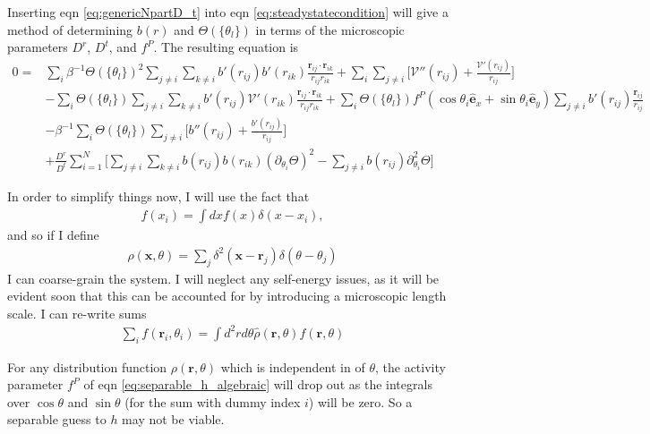 \documentclass{article}
\begin{document}
Inserting eqn \ref{eq:genericNpartD_t} into eqn \ref{eq:steadystatecondition} will give a method of
determining $b(r)$ and $\Theta(\{\theta_l\})$ in terms of the microscopic parameters $D^r$, $D^t$,
and $f^P$. The resulting equation is
\begin{align}\label{eq:separable_h_algebraic}
  0
  =&\sum_{i}\beta^{-1}\Theta(\{\theta_l\})^2
     \sum_{j\neq i}\sum_{k\neq i} b'(r_{ij})b'(r_{ik})
     \frac{\bm{r}_{ij}\cdot\bm{r}_{ik}}{r_{ij}r_{ik}}
     + \sum_i\sum_{j\neq i}\bigg[\mathcal{V}''(r_{ij})
     +\frac{\mathcal{V}'(r_{ij})}{r_{ij}}\bigg]\nonumber\\
   & - \sum_i\Theta(\{\theta_l\})\sum_{j\neq i}\sum_{k\neq i}
     b'(r_{ij})\mathcal{V}'(r_{ik})
     \frac{\bm{r}_{ij}\cdot\bm{r}_{ik}}{r_{ij}r_{ik}}
     +\sum_i\Theta(\{\theta_l\})
     f^P(\cos\theta_i\hat{\bm{e}}_x+\sin\theta_i\hat{\bm{e}}_y)
     \sum_{j\neq i}b'(r_{ij})
     \frac{\bm{r}_{ij}}{r_{ij}}\nonumber\\
   & - \beta^{-1}\sum_i\Theta(\{\theta_l\})\sum_{j\neq i}\bigg[b''(r_{ij})
     +\frac{b'(r_{ij})}{r_{ij}}\bigg]\nonumber\\
   & + \frac{D^r}{D^t}\sum_{i=1}^{N}\big[\sum_{j\neq i}\sum_{k\neq i} b(r_{ij})b(r_{ik})
     (\partial_{\theta_i}\Theta)^2
     -\sum_{j\neq i}b(r_{ij})\partial_{\theta_i}^2\Theta\big]
\end{align}
  

In order to simplify things now, I will use the fact that
\begin{align}
  f(x_i) = \int dx f(x)\delta(x-x_i),
\end{align}
and so if I define
\begin{align}
  \hat{\rho}(\bm{x},\theta) = \sum_j \delta^2(\bm{x}-\bm{r}_j)\delta(\theta-\theta_j)
\end{align}
I can coarse-grain the system. I will neglect any self-energy issues, as it will be evident
soon that this can be accounted for by introducing a microscopic length scale.
I can re-write sums
\begin{align}
  \sum_i f(\bm{r}_i,\theta_i) = \int d^2rd\theta\hat{\rho}(\bm{r},\theta)f(\bm{r},\theta)
\end{align}

For any distribution function $\rho(\bm{r},\theta)$ which is independent in of $\theta$, the
activity parameter $f^P$ of eqn \ref{eq:separable_h_algebraic} will drop out as the integrals
over $\cos\theta$ and $\sin\theta$ (for the sum with dummy index $i$) will be zero. So a
separable guess to $h$ may not be viable.
\end{document}
